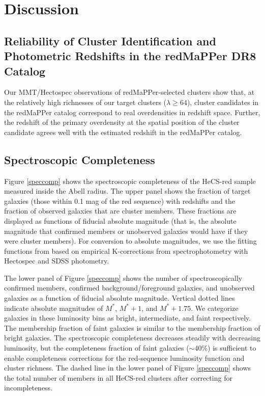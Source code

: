 \section{Discussion}

\subsection{Reliability of Cluster Identification and Photometric Redshifts in the redMaPPer DR8 Catalog}

Our MMT/Hectospec observations of redMaPPer-selected clusters show that, 
at the relatively high richnesses of our target clusters ($\lambda \geq 64$), 
cluster candidates in the redMaPPer catalog correspond to real overdensities 
in redshift space.  Further, the redshift of the primary overdensity at the spatial 
position of the cluster candidate agrees well with the estimated redshift in the 
redMaPPer catalog. 

\subsection{Spectroscopic Completeness}

Figure \ref{speccomp} shows the spectroscopic completeness of the HeCS-red 
sample measured inside the Abell radius.  The upper panel shows the fraction of 
target galaxies (those within 0.1 mag of the red sequence) with redshifts and the
fraction of observed galaxies that are cluster members.  These fractions are displayed 
as functions of fiducial absolute magnitude (that is, the absolute magnitude that 
confirmed members or unobserved galaxies would have if they were cluster members). 
For conversion to absolute magnitudes, we use the fitting functions from 
\citet{westra10} based on empirical K-corrections from spectrophotometry 
with Hectospec and SDSS photometry.

The lower panel of Figure \ref{speccomp} shows the number of spectroscopically
confirmed members, confirmed background/foreground galaxies, and unobserved 
galaxies as a function of fiducial absolute magnitude. Vertical dotted lines 
indicate absolute magnitudes of $M^*$, $M^*+1$, and $M^*+1.75$.  
We categorize galaxies in these luminosity bins as bright, intermediate, and 
faint respectively.  The membership fraction of faint galaxies is similar 
to the membership fraction of bright galaxies.  The spectroscopic completeness 
decreases steadily with decreasing luminosity, but the completeness fraction 
of faint galaxies ($\sim$40\%) is sufficient to enable completeness 
corrections for the red-sequence luminosity function and cluster richness.
The dashed line in the lower panel of Figure \ref{speccomp} shows the 
total number of members in all HeCS-red clusters after correcting for incompleteness.  

